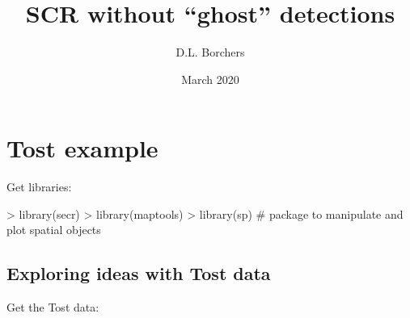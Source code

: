 \documentclass{article}
\begin{document}


\title{SCR without ``ghost'' detections}
\author{D.L. Borchers}
\date{March 2020}
\maketitle


\section{Tost example}

Get libraries:
\small{
\begin{Schunk}
\begin{Sinput}
> library(secr)
> library(maptools)
> library(sp) # package to manipulate and plot spatial objects
\end{Sinput}
\end{Schunk}
}

\subsection{Exploring ideas with Tost data}

Get the Tost data:
\end{document}
